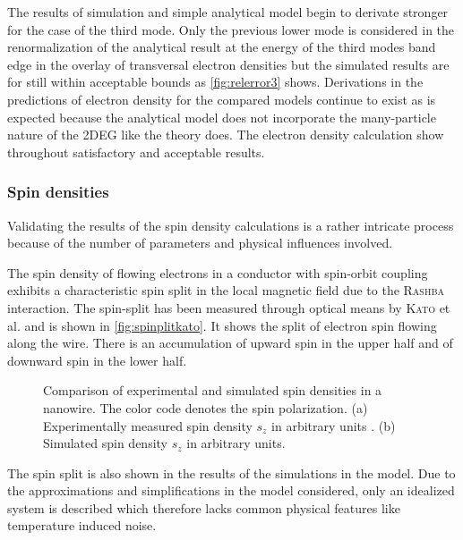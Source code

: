 The results of simulation and simple analytical model begin to derivate stronger for the case of the third mode. Only the previous lower mode is considered in the renormalization of the analytical result at the energy of the third modes band edge in the overlay of transversal electron densities but the simulated results are for still within acceptable bounds as \cref{fig:relerror3} shows. Derivations in the predictions of electron density for the compared models continue to exist as is expected because the analytical model does not incorporate the many-particle nature of the 2DEG like the \gfnc{} theory does.
The electron density calculation show throughout satisfactory and acceptable results.\par
\FloatBarrier
\subsubsection{Spin densities}
Validating the results of the spin density calculations is a rather intricate process because of the number of parameters and physical influences involved.\par
The spin density of flowing electrons in a conductor with spin-orbit coupling exhibits a characteristic spin split in the local magnetic field due to the \textsc{Rashba} interaction. The spin-split has been measured through optical means by \textsc{Kato} et al. \cite{Kato2004Science} and is shown in \cref{fig:spinplitkato}. It shows the split of electron spin flowing along the wire. There is an accumulation of upward spin in the upper half and of downward spin in the lower half.
\begin{figure}[h]
  \begin{center}
    \qquad
    \qquad
    \caption{Comparison of experimental and simulated spin densities in a nanowire. The color code denotes the spin polarization. (a) Experimentally measured spin density $s_z$ in arbitrary units \cite{Kato2004Science}. (b) Simulated spin density $s_z$ in arbitrary units.}
  \end{center}
\end{figure}
The spin split is also shown in the results of the simulations in the \gfnc{} model. Due to the approximations and simplifications in the model considered, only an idealized system is described which therefore lacks common physical features like temperature induced noise.\par
\FloatBarrier

